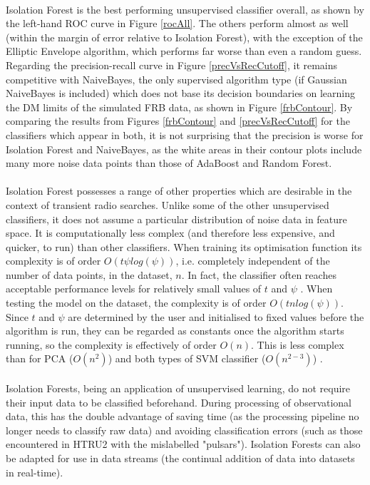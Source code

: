 \documentclass[12pt]{article}
\begin{document}
\paragraph{}
Isolation Forest is the best performing unsupervised classifier overall, as shown by the left-hand ROC curve in Figure \ref{rocAll}. The others perform almost as well (within the margin of error relative to Isolation Forest), with the exception of the Elliptic Envelope algorithm, which performs far worse than even a random guess. Regarding the precision-recall curve in Figure \ref{precVsRecCutoff}, it remains competitive with NaiveBayes, the only supervised algorithm type (if Gaussian NaiveBayes is included) which does not base its decision boundaries on learning the DM limits of the simulated FRB data, as shown in Figure \ref{frbContour}. By comparing the results from Figures \ref{frbContour} and \ref{precVsRecCutoff} for the classifiers which appear in both, it is not surprising that the precision is worse for Isolation Forest and NaiveBayes, as the white areas in their contour plots include many more noise data points than those of AdaBoost and Random Forest.
\paragraph{}
Isolation Forest possesses a range of other properties which are desirable in the context of transient radio searches. Unlike some of the other unsupervised classifiers, it does not assume a particular distribution of noise data in feature space. It is computationally less complex (and therefore less expensive, and quicker, to run) than other classifiers. When training its optimisation function its complexity is of order $O(t \psi log(\psi))$, i.e. completely independent of the number of data points, in the dataset, $n$. In fact, the classifier often reaches acceptable performance levels for relatively small values of $t$ and $\psi$ \cite{liu2008isolation}. When testing the model on the dataset, the complexity is of order $O(tn log(\psi))$. Since $t$ and $\psi$ are determined by the user and initialised to fixed values before the algorithm is run, they can be regarded as constants once the algorithm starts running, so the complexity is effectively of order $O(n)$. This is less complex than for PCA ($O(n^{2})$) and both types of SVM classifier ($O(n^{2-3})$) \cite{scikit-learn}.
\paragraph{}
Isolation Forests, being an application of unsupervised learning, do not require their input data to be classified beforehand. During processing of observational data, this has the double advantage of saving time (as the processing pipeline no longer needs to classify raw data) and avoiding classification errors (such as those encountered in HTRU2 with the mislabelled "pulsars"). Isolation Forests can also be adapted for use in data streams (the continual addition of data into datasets in real-time).
\end{document}
